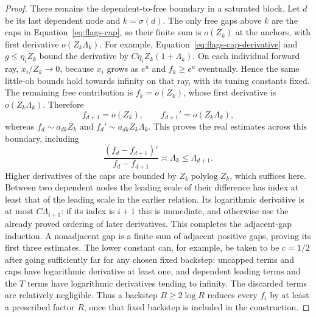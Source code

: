 \begin{proof}
There remains the dependent-to-free boundary in a saturated block.
Let $d$ be its last dependent node and $k=\sigma(d)$. The only
free gaps above $k$ are the caps in
Equation~\eqref{eq:flags-cap}, so their finite sum is $o(Z_k)$ at
the anchors, with first derivative $o(Z_k\Lambda_k)$. For example,
Equation~\eqref{eq:flags-cap-derivative} and $g\le\eta_iZ_k$
bound the derivative by $C\eta_iZ_k(1+\Lambda_k)$.
On each individual forward ray, $x_i/Z_k\to0$, because $x_i$ grows
as $e^u$ and $f_k\ge e^u$ eventually. Hence the same little-oh
bounds hold towards infinity on that ray, with its tuning constants
fixed. The remaining free contribution is $f_k=o(Z_k)$, whose
first derivative is $o(Z_k\Lambda_k)$. Therefore
\[
 f_{d+1}=o(Z_k),\qquad
 f_{d+1}'=o(Z_k\Lambda_k),
\]
whereas $f_d\sim a_{dk}Z_k$ and
$f_d'\sim a_{dk}Z_k\Lambda_k$.
This proves the real estimates across this boundary, including
\[
 \frac{(f_d-f_{d+1})'}{f_d-f_{d+1}}
       \asymp\Lambda_k\le\Lambda_{d+1}.
\]
Higher derivatives of the caps are bounded by
$Z_k\operatorname{polylog}Z_k$, which suffices here. Between two
dependent nodes the leading scale of their difference has index at
least that of the leading scale in the earlier relation. Its
logarithmic derivative is at most $C\Lambda_{i+1}$: if its index
is $i+1$ this is immediate, and otherwise use the already proved
ordering of later derivatives. This completes the adjacent-gap
induction. A nonadjacent gap is a finite sum of adjacent positive
gaps, proving its first three estimates. The lower constant can,
for example, be taken to be $c=1/2$ after going sufficiently far
for any chosen fixed backstep: uncapped terms and caps have
logarithmic derivative at least one, and dependent leading terms
and the $T$ terms have logarithmic derivatives tending to infinity.
The discarded terms are relatively negligible. Thus a backstep
$B\ge2\log R$ reduces every $f_i$ by at least a prescribed factor
$R$, once that fixed backstep is included in the construction.


\end{proof}
